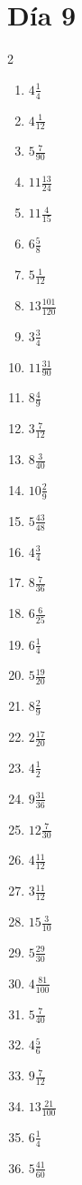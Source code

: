 \documentclass[12pt]{article}
\begin{document}
\section*{Día 9}
\begin{multicols}{2}\begin{enumerate}
\item $ 4 \frac{1}{4} $
\item $ 4 \frac{1}{12} $
\item $ 5 \frac{7}{90} $
\item $ 11 \frac{13}{24} $
\item $ 11 \frac{4}{15} $
\item $ 6 \frac{5}{8} $
\item $ 5 \frac{1}{12} $
\item $ 13 \frac{101}{120} $
\item $ 3 \frac{3}{4} $
\item $ 11 \frac{31}{90} $
\item $ 8 \frac{4}{9} $
\item $ 3 \frac{7}{12} $
\item $ 8 \frac{3}{40} $
\item $ 10 \frac{2}{9} $
\item $ 5 \frac{43}{48} $
\item $ 4 \frac{3}{4} $
\item $ 8 \frac{7}{36} $
\item $ 6 \frac{6}{25} $
\item $ 6 \frac{1}{4} $
\item $ 5 \frac{19}{20} $
\item $ 8 \frac{2}{9} $
\item $ 2 \frac{17}{20} $
\item $ 4 \frac{1}{2} $
\item $ 9 \frac{31}{36} $
\item $ 12 \frac{7}{30} $
\item $ 4 \frac{11}{12} $
\item $ 3 \frac{11}{12} $
\item $ 15 \frac{3}{10} $
\item $ 5 \frac{29}{30} $
\item $ 4 \frac{81}{100} $
\item $ 5 \frac{7}{40} $
\item $ 4 \frac{5}{6} $
\item $ 9 \frac{7}{12} $
\item $ 13 \frac{21}{100} $
\item $ 6 \frac{1}{4} $
\item $ 5 \frac{41}{60} $

\end{enumerate}
\end{multicols}
\end{document}

